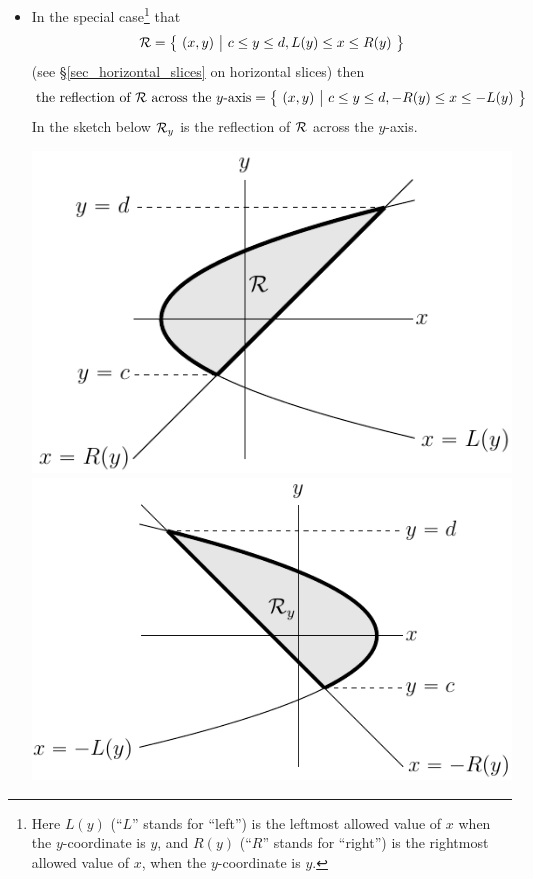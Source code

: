 \begin{itemize}
\item
In the special case\footnote{Here $L(y)$ (``$L$'' stands for ``left'') is the leftmost allowed value of $x$ when the $y$-coordinate is $y$, and 
$R(y)$ (``$R$'' stands for ``right'') is the rightmost allowed value of $x$, 
when the $y$-coordinate is $y$.} 
that 
\begin{equation*}
\mathcal{R}=\big\{ \ (x,y)\ \big|\ c\le y\le d, L(y)\le x\le R(y)\ \big\}
\end{equation*}
(see \S\ref{sec_horizontal_slices} on horizontal slices) then
\begin{equation*}
\text{the reflection of $\mathcal{R}$ across the $y$-axis} =\big\{ \ (x,y)\ \big|\ c\le y\le d,
                         -R(y)\le x\le -L(y)\ \big\} 
\end{equation*}
In the sketch below $\mathcal{R}_y$ is the reflection of $\mathcal{R}$ across the $y$-axis.
\begin{wfig}
\begin{center}
   \includegraphics[scale=0.89]{hSliceA.pdf}\quad
   \includegraphics[scale=0.89]{hSliceAry.pdf}
\end{center}
\end{wfig}


\end{itemize}
